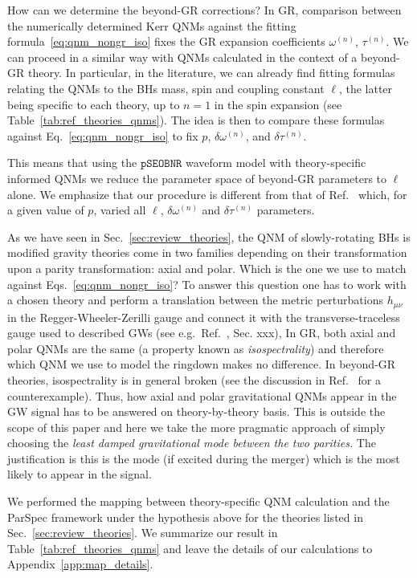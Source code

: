 \documentclass[twocolumn,
               prd,
               aps,
               superscriptaddress,
               tightenlines,
               nofootinbib,
               eqsecnum,
               amsfonts,
               amsmath,
               longbibliography]{revtex4-1}
\newcommand{\pSEOB}{\texttt{pSEOBNR}}
\begin{document}
How can we determine the beyond-GR corrections? In GR, comparison between the numerically determined
Kerr QNMs against the fitting formula~\eqref{eq:qnm_nongr_iso} fixes the GR expansion coefficients
$\omega^{(n)}$, $\tau^{(n)}$.
%
We can proceed in a similar way with QNMs calculated in the context of a beyond-GR theory.
%
In particular, in the literature, we can already find fitting formulas relating
the QNMs to the BHs mass, spin and coupling constant $\ell$, the latter being
specific to each theory, up to $n=1$ in the spin expansion (see Table~\ref{tab:ref_theories_qnms}).
%
The idea is then to compare these formulas against Eq.~\eqref{eq:qnm_nongr_iso}
to fix $p$, $\delta\omega^{(n)}$, and $\delta\tau^{(n)}$.

This means that using the $\pSEOB$ waveform model with theory-specific informed
QNMs we reduce the parameter space of beyond-GR parameters to $\ell$ alone.
%
We emphasize that our procedure is different from that of
Ref.~\cite{Carullo:2021dui} which, for a given value of $p$, varied all $\ell$,
$\delta\omega^{(n)}$ and $\delta\tau^{(n)}$ parameters.

As we have seen in Sec.~\ref{sec:review_theories}, the QNM of slowly-rotating
BHs is modified gravity theories come in two families depending on their
transformation upon a parity transformation: axial and polar. Which is the one
we use to match against Eqs.~\eqref{eq:qnm_nongr_iso}?
%
To answer this question one has to work with a chosen theory and perform a
translation between the metric perturbations $h_{\mu\nu}$ in the
Regger-Wheeler-Zerilli gauge and connect it with the transverse-traceless gauge
used to described GWs (see e.g.~Ref.~\cite{Maggiore:2018sht}, Sec. xxx),
%
In GR, both axial and polar QNMs are the same (a property known as \emph{isospectrality}) and therefore which
QNM we use to model the ringdown makes no difference.
%
In beyond-GR theories, isospectrality is in general broken (see the discussion
in Ref.~\cite{Hui:2021cpm} for a counterexample).
%
Thus, how axial and polar gravitational QNMs appear in the GW signal has to be
answered on theory-by-theory basis.
%
This is outside the scope of this paper and here we take the more pragmatic
approach of simply choosing the \emph{least damped gravitational mode between
the two parities.}
%
The justification is this is the mode (if excited during the merger) which is
the most likely to appear in the signal.

We performed the mapping between theory-specific QNM calculation and the ParSpec framework
under the hypothesis above for the theories listed in Sec.~\ref{sec:review_theories}.
%
We summarize our result in Table~\ref{tab:ref_theories_qnms} and
leave the details of our calculations to Appendix~\ref{app:map_details}.
\end{document}
